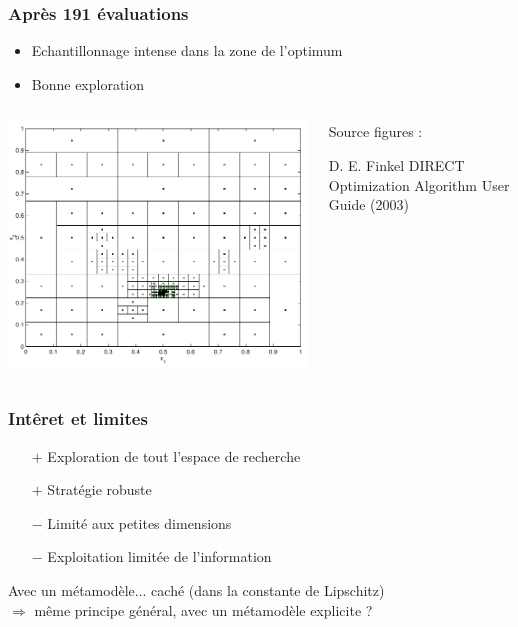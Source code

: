 \documentclass{beamer}
\begin{document}
\begin{frame}
\frametitle{Après 191 évaluations}
\begin{itemize}
 \item Echantillonnage intense dans la zone de l'optimum
 \item Bonne exploration 
\end{itemize}



\begin{columns}
 \begin{column}{80mm}
 \includegraphics[width=\textwidth]{fig/direct3.png}  
 \end{column}
 \begin{column}{40mm}
   \scriptsize{Source figures :
 \begin{thebibliography}{1}
\beamertemplatearticlebibitems
     D. E. Finkel
         \newblock DIRECT Optimization Algorithm User Guide (2003)
 \end{thebibliography}}
 \end{column}
\end{columns}
\end{frame}
\begin{frame}
\frametitle{Intêret et limites}
\begin{itemize}
 \item[$+$] Exploration de tout l'espace de recherche
 \item[$+$] Stratégie robuste
 \item[$-$] Limité aux petites dimensions
 \item[$-$] Exploitation limitée de l'information
\end{itemize}
\vspace{5mm}
Avec un métamodèle... caché (dans la constante de Lipschitz)\\
\vspace{5mm}
$\Rightarrow$ même principe général, avec un métamodèle explicite ?
\end{frame}
\end{document}
